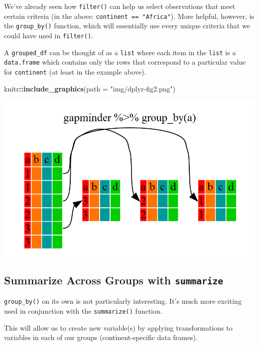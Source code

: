 \documentclass[]{book}
\newenvironment{Shaded}{\begin{snugshade}}{\end{snugshade}}
\newcommand{\DataTypeTok}[1]{\textcolor[rgb]{0.13,0.29,0.53}{#1}}
\newcommand{\KeywordTok}[1]{\textcolor[rgb]{0.13,0.29,0.53}{\textbf{#1}}}
\newcommand{\NormalTok}[1]{#1}
\newcommand{\OperatorTok}[1]{\textcolor[rgb]{0.81,0.36,0.00}{\textbf{#1}}}
\newcommand{\StringTok}[1]{\textcolor[rgb]{0.31,0.60,0.02}{#1}}
\begin{document}
We've already seen how \texttt{filter()} can help us select observations that meet certain criteria (in the above: \texttt{continent\ ==\ "Africa"}). More helpful, however, is the \texttt{group\_by()} function, which will essentially use every unique criteria that we could have used in \texttt{filter()}.

A \texttt{grouped\_df} can be thought of as a \texttt{list} where each item in the \texttt{list} is a \texttt{data.frame} which contains only the rows that correspond to a particular value for \texttt{continent} (at least in the example above).

\begin{Shaded}
\begin{Highlighting}[]
\NormalTok{knitr}\OperatorTok{::}\KeywordTok{include_graphics}\NormalTok{(}\DataTypeTok{path =} \StringTok{"img/dplyr-fig2.png"}\NormalTok{)}
\end{Highlighting}
\end{Shaded}

\begin{center}\includegraphics[width=0.7\linewidth]{img/dplyr-fig2} \end{center}

\hypertarget{summarize-across-groups-with-summarize}{%
\subsection{\texorpdfstring{Summarize Across Groups with \texttt{summarize}}{Summarize Across Groups with summarize}}\label{summarize-across-groups-with-summarize}}

\texttt{group\_by()} on its own is not particularly interesting. It's much more exciting used in conjunction with the \texttt{summarize()} function.

This will allow us to create new variable(s) by applying transformations to variables in each of our groups (continent-specific data frames).
\end{document}
